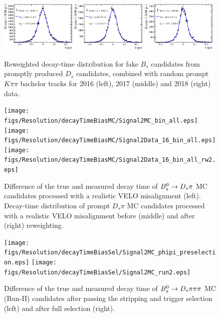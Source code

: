 \begin{figure}[h]
\centering
	\includegraphics[width=0.32\textwidth, height = !]{figs/Resolution/decayTimeBias/Signal2Data_16_bin_all.eps} 
	\includegraphics[width=0.32\textwidth, height = !]{figs/Resolution/decayTimeBias/Signal2Data_17_bin_all.eps} 
		\includegraphics[width=0.32\textwidth, height = !]{figs/Resolution/decayTimeBias/Signal2Data_18_bin_all.eps} 
\caption{Reweighted decay-time distribution for fake $B_s$ candidates from promptly produced $D_s$ candidates, combined with random prompt $K\pi\pi$ bachelor tracks 
for 2016 (left), 2017 (middle) and 2018 (right) data. }
\label{fig:decayTimeBiasData}
\end{figure}

\begin{figure}[h]
\centering
	\texttt{[image: figs/Resolution/decayTimeBiasMC/Signal2MC\_bin\_all.eps]} 
	\texttt{[image: figs/Resolution/decayTimeBiasMC/Signal2Data\_16\_bin\_all.eps]} 
	\texttt{[image: figs/Resolution/decayTimeBiasMC/Signal2Data\_16\_bin\_all\_rw2.eps]} 
\caption{ Difference of the true and measured decay time of ${{B}^0_{s}}\rightarrow{\ensuremath{{D}_{s}}}{\ensuremath{\pi}}$ MC candidates processed with a realistic VELO misalignment (left).
Decay-time distribution of prompt $D_s \pi$ MC candidates processed with a realistic VELO misalignment before (middle) and after (right) reweighting.
  }
\label{fig:decayTimeBiasMC}
\end{figure}



\begin{figure}[h]
\centering
	\texttt{[image: figs/Resolution/decayTimeBiasSel/Signal2MC\_phipi\_preselection.eps]} 
	\texttt{[image: figs/Resolution/decayTimeBiasSel/Signal2MC\_run2.eps]} 
\caption{Difference of the true and measured decay time of ${{B}^0_{s}}\rightarrow{\ensuremath{{D}_{s}}} \pi\pi\pi$ MC (Run-II) candidates after passing the stripping and trigger selection (left) and after full selection (right).}
\label{fig:biasSel}
\end{figure}


